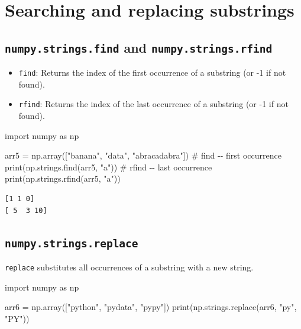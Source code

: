 \documentclass[
  english,
  letterpaper,
  DIV=11,
  numbers=noendperiod]{scrreprt}
\newenvironment{Shaded}{\begin{snugshade}}{\end{snugshade}}
\newcommand{\BuiltInTok}[1]{\textcolor[rgb]{0.00,0.23,0.31}{#1}}
\newcommand{\CommentTok}[1]{\textcolor[rgb]{0.37,0.37,0.37}{#1}}
\newcommand{\ImportTok}[1]{\textcolor[rgb]{0.00,0.46,0.62}{#1}}
\newcommand{\NormalTok}[1]{\textcolor[rgb]{0.00,0.23,0.31}{#1}}
\newcommand{\OperatorTok}[1]{\textcolor[rgb]{0.37,0.37,0.37}{#1}}
\newcommand{\StringTok}[1]{\textcolor[rgb]{0.13,0.47,0.30}{#1}}
\providecommand{\tightlist}{%
  \setlength{\itemsep}{0pt}\setlength{\parskip}{0pt}}
\begin{document}
\section{Searching and replacing
substrings}\label{searching-and-replacing-substrings}

\subsection{\texorpdfstring{\texttt{numpy.strings.find} and
\texttt{numpy.strings.rfind}}{numpy.strings.find and numpy.strings.rfind}}\label{numpy.strings.find-and-numpy.strings.rfind}

\begin{itemize}
\tightlist
\item
  \texttt{find}: Returns the index of the first occurrence of a
  substring (or -1 if not found).
\item
  \texttt{rfind}: Returns the index of the last occurrence of a
  substring (or -1 if not found).
\end{itemize}

\begin{Shaded}
\begin{Highlighting}[]
\ImportTok{import}\NormalTok{ numpy }\ImportTok{as}\NormalTok{ np}

\NormalTok{arr5 }\OperatorTok{=}\NormalTok{ np.array([}\StringTok{"banana"}\NormalTok{, }\StringTok{"data"}\NormalTok{, }\StringTok{"abracadabra"}\NormalTok{])}
\CommentTok{\# find {-}{-} first occurrence}
\BuiltInTok{print}\NormalTok{(np.strings.find(arr5, }\StringTok{"a"}\NormalTok{))}
\CommentTok{\# rfind {-}{-} last occurrence}
\BuiltInTok{print}\NormalTok{(np.strings.rfind(arr5, }\StringTok{"a"}\NormalTok{))}
\end{Highlighting}
\end{Shaded}

\begin{verbatim}
[1 1 0]
[ 5  3 10]
\end{verbatim}

\subsection{\texorpdfstring{\texttt{numpy.strings.replace}}{numpy.strings.replace}}\label{numpy.strings.replace}

\texttt{replace} substitutes all occurrences of a substring with a new
string.

\begin{Shaded}
\begin{Highlighting}[]
\ImportTok{import}\NormalTok{ numpy }\ImportTok{as}\NormalTok{ np}

\NormalTok{arr6 }\OperatorTok{=}\NormalTok{ np.array([}\StringTok{"python"}\NormalTok{, }\StringTok{"pydata"}\NormalTok{, }\StringTok{"pypy"}\NormalTok{])}
\BuiltInTok{print}\NormalTok{(np.strings.replace(arr6, }\StringTok{"py"}\NormalTok{, }\StringTok{"PY"}\NormalTok{))}
\end{Highlighting}
\end{Shaded}
\end{document}
